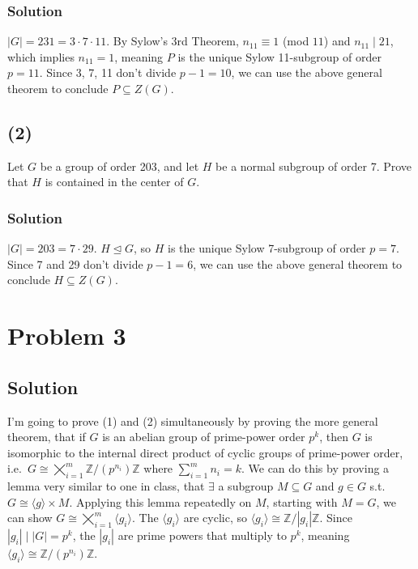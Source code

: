 \documentclass[fleqn]{article}
\begin{document}
            \subsubsection{Solution}
            $|G| = 231 = 3 \cdot 7 \cdot 11$.  By Sylow's 3rd Theorem, $n_{11} \equiv 1$ (mod $11$) and $n_{11} \mid 21$, which implies $n_{11} = 1$, meaning $P$ is the unique Sylow 11-subgroup of order $p = 11$.  Since 3, 7, 11 don't divide $p - 1 = 10$, we can use the above general theorem to conclude $P \subseteq Z(G)$.
        
        \subsection{(2)}
        Let $G$ be a group of order 203, and let $H$ be a normal subgroup of order 7.  Prove that $H$ is contained in the center of $G$.
        
            \subsubsection{Solution}
            $|G| = 203 = 7 \cdot 29$.  $H \unlhd G$, so $H$ is the unique Sylow 7-subgroup of order $p = 7$.  Since 7 and 29 don't divide $p - 1 = 6$, we can use the above general theorem to conclude $H \subseteq Z(G)$.
    
    \section{Problem 3}
        
        \subsection{Solution}
        I'm going to prove (1) and (2) simultaneously by proving the more general theorem, that if $G$ is an abelian group of prime-power order $p^k$, then $G$ is isomorphic to the internal direct product of cyclic groups of prime-power order, i.e.\ $G \cong \bigtimes\limits_{i = 1}^m \mathbb{Z}/(p^{n_i})\mathbb{Z}$ where $\sum\limits_{i = 1}^m n_i = k$.  We can do this by proving a lemma very similar to one in class, that $\exists$ a subgroup $M \subseteq G$ and $g \in G$ s.t.\ $G \cong \langle g \rangle \times M$.  Applying this lemma repeatedly on $M$, starting with $M = G$, we can show $G \cong \bigtimes\limits_{i = 1}^m \langle g_i \rangle$.  The $\langle g_i \rangle$ are cyclic, so $\langle g_i \rangle \cong \mathbb{Z}/|g_i|\mathbb{Z}$.  Since $|g_i| \mid |G| = p^k$, the $|g_i|$ are prime powers that multiply to $p^k$, meaning $\langle g_i \rangle \cong \mathbb{Z}/(p^{n_i})\mathbb{Z}$.
        
\end{document}
